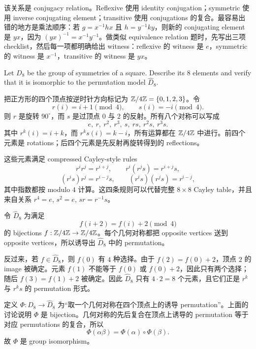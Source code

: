 \begin{explanation}
该关系是 conjugacy relation。Reflexive 使用 identity conjugation；symmetric 使用 inverse conjugating element；transitive 使用 conjugations 的复合。最容易出错的地方是乘法顺序：若 \(g=x^{-1}hx\) 且 \(h=y^{-1}ky\)，则新的 conjugating element 是 \(yx\)，因为 \((yx)^{-1}=x^{-1}y^{-1}\)。做类似 equivalence relation 题时，先写出三项 checklist，然后每一项都明确给出 witness：reflexive 的 witness 是 \(e\)，symmetric 的 witness 是 \(x^{-1}\)，transitive 的 witness 是 \(yx\)。
\end{explanation}

\begin{exerciseblock}
Let \(D_8\) be the group of symmetries of a square. Describe its \(8\) elements and verify that it is isomorphic to the permutation model \(\widehat D_8\).
\end{exerciseblock}

\begin{solution}
把正方形的四个顶点按逆时针方向标记为 \(\mathbb{Z}/4\mathbb{Z}=\{0,1,2,3\}\)。令
\[
  r(i)=i+1\pmod 4,\qquad s(i)=-i\pmod 4.
\]
则 \(r\) 是旋转 \(90^\circ\)，而 \(s\) 是过顶点 \(0\) 与 \(2\) 的反射。所有八个对称可以写成
\[
  e,\ r,\ r^2,\ r^3,\ s,\ rs,\ r^2s,\ r^3s.
\]
其中 \(r^k(i)=i+k\)，而 \(r^k s(i)=k-i\)，所有运算都在 \(\mathbb{Z}/4\mathbb{Z}\) 中进行。前四个元素是 rotations；后四个元素是先反射再旋转得到的 reflections。

这些元素满足 compressed Cayley-style rules
\[
  r^i r^j=r^{i+j},\qquad
  r^i(r^j s)=r^{i+j}s,
\]
\[
  (r^i s)r^j=r^{i-j}s,\qquad
  (r^i s)(r^j s)=r^{i-j},
\]
其中指数都按 modulo \(4\) 计算。这四条规则可以代替完整 \(8\times 8\) Cayley table，并且来自关系 \(r^4=e\), \(s^2=e\), \(sr=r^{-1}s\)。

令 \(\widehat D_8\) 为满足
\[
  f(i+2)=f(i)+2\pmod 4
\]
的 bijections \(f:\mathbb{Z}/4\mathbb{Z}\to\mathbb{Z}/4\mathbb{Z}\)。每个几何对称都把 opposite vertices 送到 opposite vertices，所以诱导出 \(\widehat D_8\) 中的 permutation。

反过来，若 \(f\in\widehat D_8\)，则 \(f(0)\) 有 \(4\) 种选择。由于 \(f(2)=f(0)+2\)，顶点 \(2\) 的 image 被确定。元素 \(f(1)\) 不能等于 \(f(0)\) 或 \(f(0)+2\)，因此只有两个选择；随后 \(f(3)=f(1)+2\) 被确定。因此 \(\widehat D_8\) 只有 \(4\cdot2=8\) 个元素，且它们正是 \(r^k\) 与 \(r^k s\) 的 permutation 形式。

定义 \(\Phi:D_8\to\widehat D_8\) 为“取一个几何对称在四个顶点上的诱导 permutation”。上面的讨论说明 \(\Phi\) 是 bijection。几何对称的先后复合在顶点上诱导的 permutation 等于对应 permutations 的复合，所以
\[
  \Phi(\alpha\beta)=\Phi(\alpha)\circ\Phi(\beta).
\]
故 \(\Phi\) 是 group isomorphism。
\end{solution}

